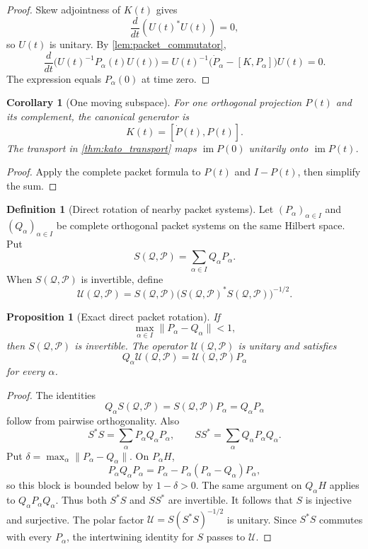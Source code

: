 \documentclass{aomart}
\newtheorem{proposition}[proposition]{Proposition}
\newtheorem{corollary}[corollary]{Corollary}
\theoremstyle{definition}
\newtheorem{definition}[definition]{Definition}
\theoremstyle{remark}
\newcommand{\Pcal}{\mathcal P}
\newcommand{\Qcal}{\mathcal Q}
\newcommand{\Ucal}{\mathcal U}
\newcommand{\im}{\operatorname{im}}
\begin{document}
\begin{proof}
Skew adjointness of $K(t)$ gives
\[
\frac{d}{dt}(U(t)^*U(t))=0,
\]
so $U(t)$ is unitary.  By \cref{lem:packet_commutator},
\[
\frac{d}{dt}\big(U(t)^{-1}P_\alpha(t)U(t)\big)
=
U(t)^{-1}\big(\dot P_\alpha-[K,P_\alpha]\big)U(t)
=0.
\]
The expression equals $P_\alpha(0)$ at time zero.
\end{proof}

\begin{corollary}[One moving subspace]\label{cor:one_moving_subspace}
For one orthogonal projection $P(t)$ and its complement, the canonical generator is
\[
K(t)=[\dot P(t),P(t)].
\]
The transport in \cref{thm:kato_transport} maps $\im P(0)$ unitarily onto $\im P(t)$.
\end{corollary}

\begin{proof}
Apply the complete packet formula to $P(t)$ and $I-P(t)$, then simplify the sum.
\end{proof}


\begin{definition}[Direct rotation of nearby packet systems]\label{def:packet_direct_rotation}
Let $(P_\alpha)_{\alpha\in I}$ and $(Q_\alpha)_{\alpha\in I}$ be complete orthogonal packet systems on the same Hilbert space.  Put
\[
S(\Qcal,\Pcal)=\sum_{\alpha\in I}Q_\alpha P_\alpha.
\]
When $S(\Qcal,\Pcal)$ is invertible, define
\[
\Ucal(\Qcal,\Pcal)
=
S(\Qcal,\Pcal)
\big(S(\Qcal,\Pcal)^*S(\Qcal,\Pcal)\big)^{-1/2}.
\]
\end{definition}

\begin{proposition}[Exact direct packet rotation]\label{prop:packet_direct_rotation}
If
\[
\max_{\alpha\in I}\|P_\alpha-Q_\alpha\|<1,
\]
then $S(\Qcal,\Pcal)$ is invertible.  The operator $\Ucal(\Qcal,\Pcal)$ is unitary and satisfies
\[
Q_\alpha\Ucal(\Qcal,\Pcal)
=
\Ucal(\Qcal,\Pcal)P_\alpha
\]
for every $\alpha$.
\end{proposition}

\begin{proof}
The identities
\[
Q_\alpha S(\Qcal,\Pcal)
=
S(\Qcal,\Pcal)P_\alpha
=
Q_\alpha P_\alpha
\]
follow from pairwise orthogonality.  Also
\[
S^*S
=
\sum_\alpha P_\alpha Q_\alpha P_\alpha,
\qquad
SS^*
=
\sum_\alpha Q_\alpha P_\alpha Q_\alpha.
\]
Put $\delta=\max_\alpha\|P_\alpha-Q_\alpha\|$.  On $P_\alpha H$,
\[
P_\alpha Q_\alpha P_\alpha
=
P_\alpha-P_\alpha(P_\alpha-Q_\alpha)P_\alpha,
\]
so this block is bounded below by $1-\delta>0$.  The same argument on $Q_\alpha H$ applies to $Q_\alpha P_\alpha Q_\alpha$.  Thus both $S^*S$ and $SS^*$ are invertible.  It follows that $S$ is injective and surjective.  The polar factor $\Ucal=S(S^*S)^{-1/2}$ is unitary.  Since $S^*S$ commutes with every $P_\alpha$, the intertwining identity for $S$ passes to $\Ucal$.
\end{proof}
\end{document}

